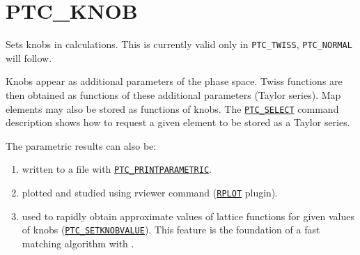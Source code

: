 


\section{PTC\_KNOB}
\label{sec:ptc_knob}


Sets knobs in \ptc calculations. This is currently valid only in
{\tt  PTC\_TWISS}, {\tt PTC\_NORMAL} will follow. 

Knobs appear as additional parameters of the phase space. Twiss
functions are then obtained as functions of these additional parameters
(Taylor series).  
Map elements may also be stored as functions of knobs. 
The \hyperref[sec:ptc_select]{\tt PTC\_SELECT} command 
description shows how to request a given element to be stored as a 
Taylor series.  

The parametric results can also be: 
\begin{enumerate}
   \item  written to a file with
     \hyperref[sec:ptc_printparametric]{\tt PTC\_PRINTPARAMETRIC}. 
   \item  plotted and studied using rviewer command
     (\hyperref[sec:rplot]{\tt RPLOT} plugin). 
   \item  used to rapidly obtain approximate values of lattice
     functions for given values of knobs
     (\hyperref[sec:ptc_setknobvalue]{\tt PTC\_SETKNOBVALUE}). This
     feature is the foundation of a fast matching algorithm with \ptc.      
\end{enumerate}


